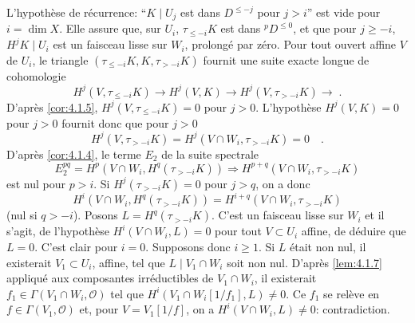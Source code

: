 \documentclass[12pt,a4paper]{article}
\theoremstyle{plain}
\theoremstyle{definition}
\newcommand{\cO}{\mathcal{O}}
\providecommand{\cO}{\mathcal{O}}
\begin{document}
L'hypoth\`{e}se de r\'{e}currence: ``$K \mid U_{j}$ est dans $D^{\leq -j}$ pour $j > i$'' est vide pour $i = \dim X$. Elle assure que, sur $U_{i}$, $\tau_{\leq -i}K$ est dans ${}^{p}D^{\leq 0}$, et que pour $j \geq -i$, $H^{j}K \mid U_{i}$ est un faisceau lisse sur $W_{i}$, prolong\'{e} par z\'{e}ro. Pour tout ouvert affine $V$ de $U_{i}$, le triangle $(\tau_{\leq -i}K, K, \tau_{> -i}K)$ fournit une suite exacte longue de cohomologie
\[
H^{j}(V, \tau_{\leq -i}K) \longrightarrow H^{j}(V,K) \longrightarrow H^{j}(V, \tau_{> -i}K) \longrightarrow\;.
\]
D'apr\`{e}s \ref{cor:4.1.5}, $H^{j}(V, \tau_{\leq -i}K) = 0$ pour $j > 0$. L'hypoth\`{e}se $H^{j}(V,K) = 0$ pour $j > 0$ fournit donc que pour $j > 0$
\[
H^{j}(V, \tau_{> -i}K) = H^{j}(V \cap W_{i}, \tau_{> -i}K) = 0\quad.
\]
D'apr\`{e}s \ref{cor:4.1.4}, le terme $E_{2}$ de la suite spectrale
\[
E_{2}^{pq} = H^{p}(V \cap W_{i}, H^{q}(\tau_{> -i}K)) \Rightarrow H^{p+q}(V \cap W_{i}, \tau_{> -i}K)
\]
est nul pour $p > i$. Si $H^{j}(\tau_{> -i}K) = 0$ pour $j > q$, on a donc
\[
H^{i}(V \cap W_{i}, H^{q}(\tau_{> -i}K)) = H^{i+q}(V \cap W_{i}, \tau_{> -i}K)
\]
(nul si $q > -i$). Posons $L = H^{q}(\tau_{> -i}K)$. C'est un faisceau lisse sur $W_{i}$ et il s'agit, de l'hypoth\`{e}se $H^{i}(V \cap W_{i}, L) = 0$ pour tout $V \subset U_{i}$ affine, de d\'{e}duire que $L = 0$. C'est clair pour $i = 0$. Supposons donc $i \geq 1$. Si $L$ \'{e}tait non nul, il existerait $V_{1} \subset U_{i}$, affine, tel que $L \mid V_{1} \cap W_{i}$ soit non nul. D'apr\`{e}s \ref{lem:4.1.7} appliqu\'{e} aux composantes irr\'{e}ductibles de $V_{1} \cap W_{i}$, il existerait $f_{1} \in \Gamma(V_{1} \cap W_{i}, \cO)$ tel que $H^{i}(V_{1} \cap W_{i}[1/f_{1}], L) \neq 0$. Ce $f_{1}$ se rel\`{e}ve en $f \in \Gamma(V_{1}, \cO)$ et, pour $V = V_{1}[1/f]$, on a $H^{i}(V \cap W_{i}, L) \neq 0$: contradiction.
\end{document}
